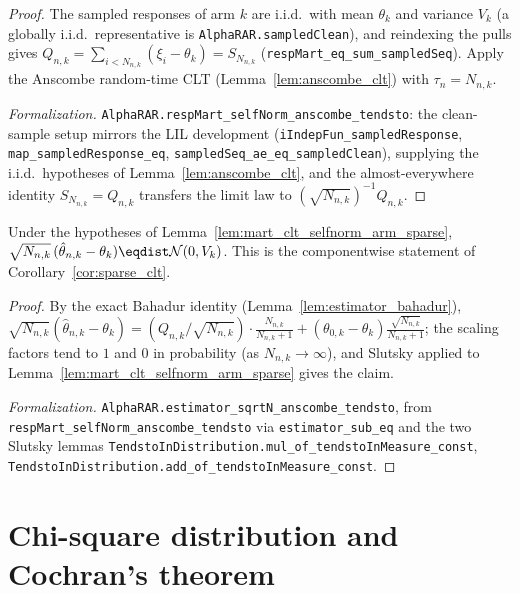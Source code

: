 \begin{proof}\leanok
{}
The sampled responses of arm $k$ are i.i.d.\ with mean $\theta_k$ and variance $V_k$
(a globally i.i.d.\ representative is \texttt{AlphaRAR.sampledClean}), and reindexing the pulls gives
$Q_{n,k}=\sum_{i<N_{n,k}}(\xi_i-\theta_k)=S_{N_{n,k}}$ (\texttt{respMart\_eq\_sum\_sampledSeq}). Apply
the Anscombe random-time CLT (Lemma~\ref{lem:anscombe_clt}) with $\tau_n=N_{n,k}$.

\emph{Formalization.} \texttt{AlphaRAR.respMart\_selfNorm\_anscombe\_tendsto}: the clean-sample setup
mirrors the LIL development (\texttt{iIndepFun\_sampledResponse}, \texttt{map\_sampledResponse\_eq},
\texttt{sampledSeq\_ae\_eq\_sampledClean}), supplying the i.i.d.\ hypotheses of
Lemma~\ref{lem:anscombe_clt}, and the almost-everywhere identity
$S_{N_{n,k}}=Q_{n,k}$ transfers the limit law to $(\sqrt{N_{n,k}})^{-1}Q_{n,k}$.
\end{proof}

\begin{lemma}\label{lem:clt_theta_arm_sparse}
\leanok
{}
Under the hypotheses of Lemma~\ref{lem:mart_clt_selfnorm_arm_sparse},
$\sqrt{N_{n,k}}\,(\hat\theta_{n,k}-\theta_k)\eqdist\mathcal N(0,V_k)$. This is the componentwise
statement of Corollary~\ref{cor:sparse_clt}.
\end{lemma}

\begin{proof}\leanok
{}
By the exact Bahadur identity (Lemma~\ref{lem:estimator_bahadur}),
$\sqrt{N_{n,k}}(\hat\theta_{n,k}-\theta_k)=(Q_{n,k}/\sqrt{N_{n,k}})\cdot\frac{N_{n,k}}{N_{n,k}+1}
 + (\theta_{0,k}-\theta_k)\frac{\sqrt{N_{n,k}}}{N_{n,k}+1}$; the scaling factors tend to $1$ and $0$
in probability (as $N_{n,k}\to\infty$), and Slutsky applied to
Lemma~\ref{lem:mart_clt_selfnorm_arm_sparse} gives the claim.

\emph{Formalization.} \texttt{AlphaRAR.estimator\_sqrtN\_anscombe\_tendsto}, from
\texttt{respMart\_selfNorm\_anscombe\_tendsto} via \texttt{estimator\_sub\_eq} and the two Slutsky
lemmas \texttt{TendstoInDistribution.mul\_of\_tendstoInMeasure\_const},
\texttt{TendstoInDistribution.add\_of\_tendstoInMeasure\_const}.
\end{proof}


\chapter{Chi-square distribution and Cochran's theorem}
\label{chap:pre_cochran}

